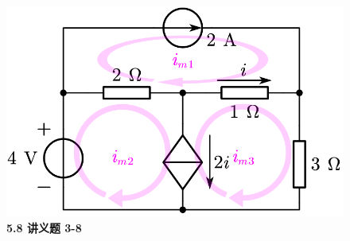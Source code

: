 \documentclass[UTF8]{report}
\theoremstyle{MyLineTheoremStyle} %
\theoremstyle{MyBlockTheoremStyle} %
\theoremstyle{MySubsubsectionStyle} %
\begin{document}
\begin{figure}[H]\centering
\includegraphics[width=0.5\columnwidth]{assets/5/5.8.png}
\caption{\bfseries 5.8 讲义题 3-8}\label{5.8 讲义题 3-8}
\end{figure}



















































































\end{document}
